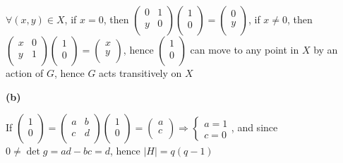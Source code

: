 \documentclass[10pt]{article}
\newcommand{\<}[1]{\langle #1 \rangle}
\begin{document}
$\forall (x,y)\in X$, if $x=0$, then $\left( {\begin{array}{cc}
   0 & 1 \\
   y & 0 \\
  \end{array} } \right)\left( {\begin{array}{c}
   1 \\
   0 \\
  \end{array} } \right)=\left( {\begin{array}{c}
   0 \\
   y \\
  \end{array} } \right)$, if $x\neq0$, then $\left( {\begin{array}{cc}
   x & 0 \\
   y & 1 \\
  \end{array} } \right)\left( {\begin{array}{c}
   1 \\
   0 \\
  \end{array} } \right)=\left( {\begin{array}{c}
   x \\
   y \\
  \end{array} } \right)$, hence $\left( {\begin{array}{c}
   1 \\
   0 \\
  \end{array} } \right)$ can move to any point in $X$ by an action of $G$, hence $G$ acts transitively on $X$ \par
\textbf{(b)} \par
If $\left( {\begin{array}{c}
   1 \\
   0 \\
  \end{array} } \right)=\left( {\begin{array}{cc}
   a & b \\
   c & d \\
  \end{array} } \right)\left( {\begin{array}{c}
   1 \\
   0 \\
  \end{array} } \right)=\left( {\begin{array}{c}
   a \\
   c \\
  \end{array} } \right)\Rightarrow\begin{cases}
  a=1 \\
  c=0
  \end{cases}$, and since $0\neq\det g=ad-bc=d$, hence $|H|=q(q-1)$ \par
\end{document}
